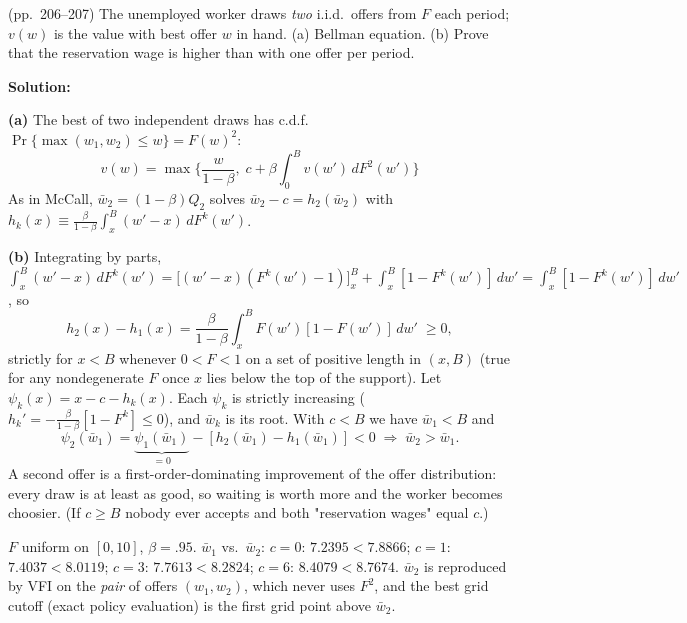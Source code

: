 \documentclass[12pt, letterpaper]{article}
\newcommand{\wb}{\bar w}
\begin{document}
\begin{tcolorbox}[evenbox,title={Exercise 6.2 \quad Two Offers per Period}]
\begin{tcolorbox}[questionbox]
(pp.~206--207) The unemployed worker draws \emph{two} i.i.d.\ offers from $F$ each period; $v(w)$ is the
value with best offer $w$ in hand. (a) Bellman equation. (b) Prove that the reservation wage is higher
than with one offer per period.
\end{tcolorbox}

\textbf{Solution:}

\textbf{(a)} The best of two independent draws has c.d.f.\ $\Pr\{\max(w_1,w_2)\le w\}=F(w)^2$:
\[
\boxed{v(w)=\max\Big\{\frac{w}{1-\beta},\;c+\beta\int_0^Bv(w')\,dF^2(w')\Big\}}
\]
As in McCall, $\wb_2=(1-\beta)Q_2$ solves $\wb_2-c=h_2(\wb_2)$ with
$h_k(x)\equiv\frac{\beta}{1-\beta}\int_x^B(w'-x)\,dF^k(w')$.

\textbf{(b)} Integrating by parts,
$\int_x^B(w'-x)\,dF^k(w')=\big[(w'-x)(F^k(w')-1)\big]_x^B+\int_x^B[1-F^k(w')]\,dw'=\int_x^B[1-F^k(w')]\,dw'$, so
\[
h_2(x)-h_1(x)=\frac{\beta}{1-\beta}\int_x^BF(w')[1-F(w')]\,dw'\;\ge0,
\]
strictly for $x<B$ whenever $0<F<1$ on a set of positive length in $(x,B)$ (true for any nondegenerate
$F$ once $x$ lies below the top of the support). Let $\psi_k(x)=x-c-h_k(x)$. Each $\psi_k$ is strictly
increasing ($h_k'=-\frac{\beta}{1-\beta}[1-F^k]\le0$), and $\wb_k$ is its root. With $c<B$ we have $\wb_1<B$ and
\[
\psi_2(\wb_1)=\underbrace{\psi_1(\wb_1)}_{=0}-[h_2(\wb_1)-h_1(\wb_1)]<0
\;\Longrightarrow\;\boxed{\wb_2>\wb_1}.
\]
A second offer is a first-order-dominating improvement of the offer distribution: every draw is at least
as good, so waiting is worth more and the worker becomes choosier. (If $c\ge B$ nobody ever accepts and
both "reservation wages" equal $c$.)

\begin{tcolorbox}[databox]
$F$ uniform on $[0,10]$, $\beta=.95$. $\wb_1$ vs.\ $\wb_2$: $c=0$: $7.2395<7.8866$; $c=1$: $7.4037<8.0119$;
$c=3$: $7.7613<8.2824$; $c=6$: $8.4079<8.7674$. $\wb_2$ is reproduced by VFI on the \emph{pair} of offers
$(w_1,w_2)$, which never uses $F^2$, and the best grid cutoff (exact policy evaluation) is the first
grid point above $\wb_2$.
\end{tcolorbox}
\end{tcolorbox}
\end{document}
